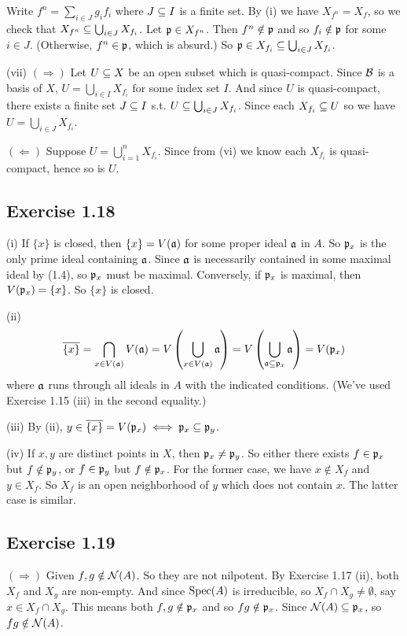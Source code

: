 \documentclass[../A&M.tex]{subfiles}
\begin{document}
Write $f^n=\sum_{i\in J} g_if_i$ where $J\subseteq I$ is a finite set. By (i) we have $X_{f^n} = X_f$, so we check that $X_{f^n} \subseteq \bigcup_{i\in J} X_{f_i}$. Let $\mathfrak{p}\in X_{f^n}$. Then $f^n\notin\mathfrak{p}$ and so $f_i\notin \mathfrak{p}$ for some $i\in J$. (Otherwise, $f^n\in \mathfrak{p}$, which is absurd.) So $\mathfrak{p}\in X_{f_i} \subseteq \bigcup_{i\in J} X_{f_i}$.

(vii) $(\Rightarrow)$ Let $U\subseteq X$ be an open subset which is quasi-compact. Since $\mathcal{B}$ is a basis of $X$, $U=\bigcup_{i\in I} X_{f_i}$ for some index set $I$. And since $U$ is quasi-compact, there exists a finite set $J\subseteq I$ s.t. $U\subseteq \bigcup_{i\in J} X_{f_i}$. Since each $X_{f_i} \subseteq U$ so we have $U = \bigcup_{i\in J} X_{f_i}$.

$(\Leftarrow)$ Suppose $U = \bigcup_{i=1}^n X_{f_i}$. Since from (vi) we know each $X_{f_i}$ is quasi-compact, hence so is $U$.

\subsection*{Exercise 1.18}

(i) If $\{x\}$ is closed, then $\{x\}=V(\mathfrak{a})$ for some proper ideal $\mathfrak{a}$ in $A$. So $\mathfrak{p}_x$ is the only prime ideal containing $\mathfrak{a}$. Since $\mathfrak{a}$ is necessarily contained in some maximal ideal by (1.4), so $\mathfrak{p}_x$ must be maximal. Conversely, if $\mathfrak{p}_x$ is maximal, then $V(\mathfrak{p}_x)=\{x\}$. So $\{x\}$ is closed.

(ii)
$$
\overline{\{x\}} = \bigcap_{x\in V(\mathfrak{a})} V(\mathfrak{a}) = V\left( \bigcup_{x\in V(\mathfrak{a})} \mathfrak{a} \right) = V\left( \bigcup_{\mathfrak{a}\subseteq \mathfrak{p}_x} \mathfrak{a} \right) = V(\mathfrak{p}_x)
$$
where $\mathfrak{a}$ runs through all ideals in $A$ with the indicated conditions. (We've used Exercise 1.15 (iii) in the second equality.)

(iii) By (ii), $y\in\overline{\{x\}} = V(\mathfrak{p}_x) \iff \mathfrak{p}_x \subseteq \mathfrak{p}_y$.

(iv) If $x,y$ are distinct points in $X$, then $\mathfrak{p}_x\neq\mathfrak{p}_y$. So either there exists $f\in\mathfrak{p}_x$ but $f\notin\mathfrak{p}_y$, or $f\in\mathfrak{p}_y$ but $f\notin\mathfrak{p}_x$. For the former case, we have $x\notin X_f$ and $y\in X_f$. So $X_f$ is an open neighborhood of $y$ which does not contain $x$. The latter case is similar.

\subsection*{Exercise 1.19}

$(\Rightarrow)$ Given $f,g\notin\mathcal{N}(A)$. So they are not nilpotent. By Exercise 1.17 (ii), both $X_f$ and $X_g$ are non-empty. And since $\operatorname{Spec}(A)$ is irreducible, so $X_f \cap X_g \neq \emptyset$, say $x\in X_f \cap X_g$. This means both $f,g\notin\mathfrak{p}_x$ and so $fg\notin\mathfrak{p}_x$. Since $\mathcal{N}(A)\subseteq \mathfrak{p}_x$, so $fg\notin\mathcal{N}(A)$.
\end{document}
